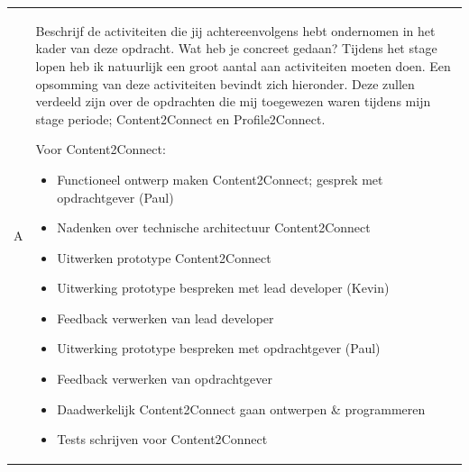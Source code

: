 \begin{tabularx}{\textwidth}{| l | X |}
\\
\hline
A & Beschrijf de activiteiten die jij achtereenvolgens hebt ondernomen in het kader van deze opdracht. Wat heb je concreet gedaan?
\newline
\newline
Tijdens het stage lopen heb ik natuurlijk een groot aantal aan activiteiten moeten doen. Een opsomming van deze activiteiten bevindt zich hieronder. Deze zullen verdeeld zijn over de opdrachten die mij toegewezen waren tijdens mijn stage periode; Content2Connect en Profile2Connect.

Voor Content2Connect:
\begin{itemize}
\item Functioneel ontwerp maken Content2Connect; gesprek met opdrachtgever (Paul)
\item Nadenken over technische architectuur Content2Connect
\item Uitwerken prototype Content2Connect
\item Uitwerking prototype bespreken met lead developer (Kevin)
\item Feedback verwerken van lead developer
\item Uitwerking prototype bespreken met opdrachtgever (Paul)
\item Feedback verwerken van opdrachtgever
\item Daadwerkelijk Content2Connect gaan ontwerpen \& programmeren
\item Tests schrijven voor Content2Connect
\end{itemize}


\end{tabularx}
